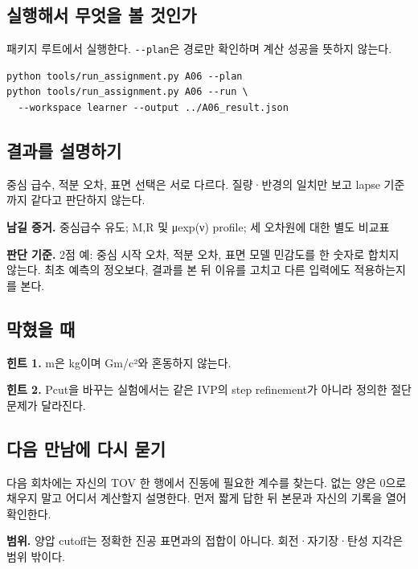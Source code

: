 \documentclass[
  10pt,
  a4paper,
]{article}
\begin{document}
\newpage

\subsection{실행해서 무엇을 볼
것인가}\label{uxc2e4uxd589uxd574uxc11c-uxbb34uxc5c7uxc744-uxbcfc-uxac83uxc778uxac00}

패키지 루트에서 실행한다. \texttt{-\/-plan}은 경로만 확인하며 계산
성공을 뜻하지 않는다.

\begin{verbatim}
python tools/run_assignment.py A06 --plan
python tools/run_assignment.py A06 --run \
  --workspace learner --output ../A06_result.json
\end{verbatim}

\subsection{결과를
설명하기}\label{uxacb0uxacfcuxb97c-uxc124uxba85uxd558uxae30}

중심 급수, 적분 오차, 표면 선택은 서로 다르다. 질량·반경의 일치만 보고
lapse 기준까지 같다고 판단하지 않는다.

\textbf{남길 증거.} 중심급수 유도; M,R 및 μexp(ν) profile; 세 오차원에
대한 별도 비교표

\textbf{판단 기준.} 2점 예: 중심 시작 오차, 적분 오차, 표면 모델
민감도를 한 숫자로 합치지 않는다. 최초 예측의 정오보다, 결과를 본 뒤
이유를 고치고 다른 입력에도 적용하는지를 본다.

\subsection{막혔을 때}\label{uxb9c9uxd614uxc744-uxb54c}

\textbf{힌트 1.} m은 kg이며 Gm/c²와 혼동하지 않는다.

\textbf{힌트 2.} Pcut을 바꾸는 실험에서는 같은 IVP의 step refinement가
아니라 정의한 절단 문제가 달라진다.

\subsection{다음 만남에 다시
묻기}\label{uxb2e4uxc74c-uxb9ccuxb0a8uxc5d0-uxb2e4uxc2dc-uxbb3buxae30}

다음 회차에는 자신의 TOV 한 행에서 진동에 필요한 계수를 찾는다. 없는
양은 0으로 채우지 말고 어디서 계산할지 설명한다. 먼저 짧게 답한 뒤
본문과 자신의 기록을 열어 확인한다.

\textbf{범위.} 양압 cutoff는 정확한 진공 표면과의 접합이 아니다.
회전·자기장·탄성 지각은 범위 밖이다.
\end{document}
